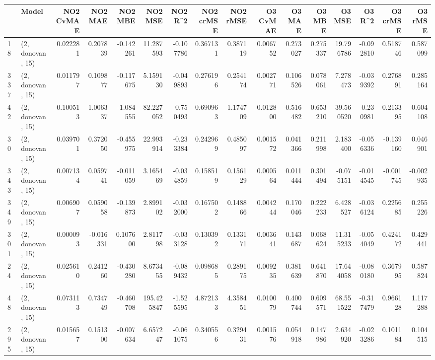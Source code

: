 \begin{tabular}{llrrrrrrrrrrrrrr}
\toprule
{} &             Model &  NO2 CvMAE &   NO2 MAE &   NO2 MBE &     NO2 MSE &   NO2 R\textasciicircum2 &  NO2 crMSE &  NO2 rMSE &  O3 CvMAE &    O3 MAE &    O3 MBE &      O3 MSE &    O3 R\textasciicircum2 &  O3 crMSE &   O3 rMSE \\
\midrule
18  &  (2, donovan, 15) &   0.022281 &  0.207839 & -0.142261 &   11.287593 & -0.107786 &   0.367131 &  0.387119 &  0.006752 &  0.273027 &  0.275337 &   19.796786 & -0.092810 &  0.518746 &  0.587099 \\
337 &  (2, donovan, 15) &   0.011797 &  0.109877 & -0.117675 &    5.159130 & -0.049893 &   0.276196 &  0.254174 &  0.002771 &  0.106526 &  0.078061 &    7.278473 & -0.039392 &  0.276891 &  0.285164 \\
42  &  (2, donovan, 15) &   0.100513 &  1.006337 & -1.084555 &   82.227052 & -0.750493 &   0.690963 &  1.174709 &  0.012800 &  0.516482 &  0.653210 &   39.560520 & -0.230981 &  0.213395 &  0.604108 \\
30  &  (2, donovan, 15) &   0.039701 &  0.372050 & -0.455975 &   22.993914 & -0.233384 &   0.242969 &  0.485097 &  0.001572 &  0.041366 &  0.211998 &    2.183400 & -0.056336 & -0.139160 &  0.046901 \\
343 &  (2, donovan, 15) &   0.007134 &  0.059741 & -0.011059 &    3.165469 & -0.034859 &   0.158519 &  0.156129 &  0.000564 &  0.011444 &  0.301494 &   -0.075151 & -0.014545 & -0.001745 & -0.002935 \\
349 &  (2, donovan, 15) &   0.006907 &  0.059058 & -0.139873 &    2.899102 & -0.032000 &   0.167502 &  0.148866 &  0.004244 &  0.170046 &  0.222233 &    6.428527 & -0.036124 &  0.225685 &  0.255226 \\
301 &  (2, donovan, 15) &   0.000093 & -0.016331 &  0.107600 &    2.811798 & -0.033128 &   0.130392 &  0.133171 &  0.003641 &  0.143687 &  0.068624 &   11.315233 & -0.054049 &  0.424172 &  0.429441 \\
24  &  (2, donovan, 15) &   0.025610 &  0.241260 & -0.430280 &    8.673455 & -0.089432 &   0.098685 &  0.289175 &  0.009235 &  0.381639 &  0.641870 &   17.644058 & -0.080180 &  0.367995 &  0.587824 \\
48  &  (2, donovan, 15) &   0.073113 &  0.734749 & -0.460708 &  195.425847 & -1.525595 &   4.872133 &  4.358451 &  0.010079 &  0.400744 &  0.609571 &   68.551522 & -0.317479 &  0.966128 &  1.117288 \\
295 &  (2, donovan, 15) &   0.015657 &  0.151300 & -0.007634 &    6.657247 & -0.061075 &   0.340556 &  0.329431 &  0.001576 &  0.054918 &  0.147986 &    2.634920 & -0.023286 &  0.101184 &  0.104515 \\

\end{tabular}
